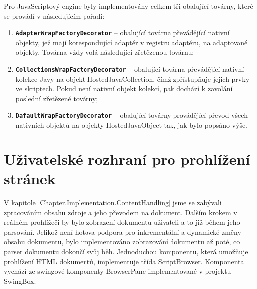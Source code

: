 Pro JavaScriptový engine byly implementovány celkem tři obalující továrny, které se provádí v následujícím pořadí:

\begin{enumerate}
  \item \textbf{\texttt{AdapterWrapFactoryDecorator}} -- obalující továrna převádějící nativní objekty, jež mají korespondující adaptér v registru adaptéru, na adaptované objekty. Továrna vždy volá následující zřetězenou továrnu;
  \item \textbf{\texttt{CollectionsWrapFactoryDecorator}} -- obalující továrna převádějící nativní kolekce Javy na objekt HostedJavaCollection, čímž zpřístupňuje jejich prvky ve skriptech. Pokud není nativní objekt kolekcí, pak dochází k zavolání poslední zřetězené továrny;
  \item \textbf{\texttt{DafaultWrapFactoryDecorator}} -- obalující továrny provádějící převod všech nativních objektů na objekty HostedJavaObject tak, jak bylo popsáno výše.
\end{enumerate}

\section{Uživatelské rozhraní pro prohlížení stránek}
\label{Chapter.Implementation.UserInterface}

V kapitole \ref{Chapter.Implementation.ContentHandling} jsme se zabývali zpracováním obsahu zdroje a jeho převodem na dokument. Dalším krokem v reálném prohlížeči by bylo zobrazení dokumentu uživateli a to již během jeho parsování. Jelikož není hotova podpora pro inkrementální a dynamické změny obsahu dokumentu, bylo implementováno zobrazování dokumentu až poté, co parser dokumentu dokončí svůj běh. Jednoduchou komponentu, která umožňuje prohlížení HTML dokumentů, implementuje třída ScriptBrowser. Komponenta vychází ze swingové komponenty BrowserPane implementované v projektu SwingBox.

